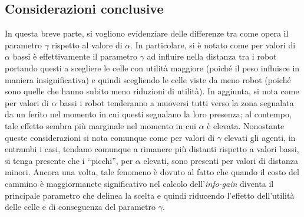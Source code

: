\subsection{Considerazioni conclusive}
In questa breve parte, si vogliono evidenziare delle differenze tra come opera il parametro $\gamma$ rispetto al valore di $\alpha$.
In particolare, si è notato come per valori di $\alpha$ bassi è effettivamente il parametro $\gamma$ ad influire nella distanza tra i robot portando questi a scegliere le celle con utilità maggiore (poiché il peso influisce in maniera insignificativa) e quindi scegliendo le celle viste da meno robot (poiché sono quelle che hanno subito meno riduzioni di utilità).
In aggiunta, si nota come per valori di $\alpha$ bassi i robot tenderanno a muoversi tutti verso la zona segnalata da un ferito nel momento in cui questi segnalano la loro presenza; al contempo, tale effetto sembra più marginale nel momento in cui $\alpha$ è elevata.
Nonostante queste considerazioni si nota comunque come per valori di $\gamma$ elevati gli agenti, in entrambi i casi, tendano comunque a rimanere più distanti rispetto a valori bassi, si tenga presente che i “picchi”, per $\alpha$ elevati, sono presenti per valori di distanza minori.
Ancora una volta, tale fenomeno è dovuto al fatto che quando il costo del cammino è maggiormanete significativo nel calcolo dell'\textit{info-gain} diventa il principale parametro che delinea la scelta e quindi riducendo l'effetto dell'utilità delle celle e di conseguenza del parametro $\gamma$.
